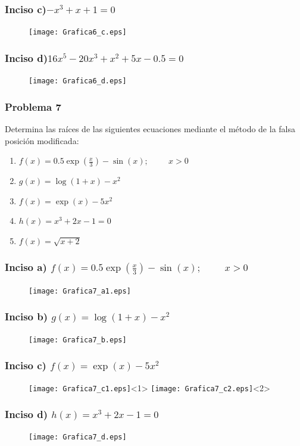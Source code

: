 \begin{frame}
\frametitle{Inciso c)$-x^{3} + x + 1 = 0$}
\begin{figure}
	\centering
	\texttt{[image: Grafica6\_c.eps]}
\end{figure}
\end{frame}
\begin{frame}
\frametitle{Inciso d)$16x^{5} - 20x^{3} + x^{2} + 5x - 0.5 = 0$}
\begin{figure}
	\centering
	\texttt{[image: Grafica6\_d.eps]}
\end{figure}
\end{frame}
\begin{frame}
\frametitle{Problema 7}
Determina las raíces de las siguientes ecuaciones mediante el método de la falsa posición modificada:
	\begin{enumerate}
		\renewcommand{\arraystretch}{1.5}
		\item $f(x) = 0.5\exp(\frac{x}{3})- \sin(x); \hspace{1cm} x > 0$
		\item $g(x) = \log(1 + x) - x^{2}$
		\item $f(x) = \exp(x) - 5x^{2}$
		\item $h(x) = x^{3} + 2x - 1 = 0$
		\item $f(x) = \sqrt{x+2}$
	\end{enumerate}
\end{frame}
\begin{frame}
\frametitle{Inciso a) $f(x) = 0.5\exp(\frac{x}{3})- \sin(x); \hspace{1cm} x > 0$}
\begin{figure}
	\centering
	\texttt{[image: Grafica7\_a1.eps]}
\end{figure}
\end{frame}
\begin{frame}
\frametitle{Inciso b) $g(x) = \log(1 + x) - x^{2}$}
\begin{figure}
	\centering
	\texttt{[image: Grafica7\_b.eps]}
\end{figure}
\end{frame}
\begin{frame}
\frametitle{Inciso c) $f(x) = \exp(x) - 5x^{2}$}
\begin{figure}
	\centering
	\texttt{[image: Grafica7\_c1.eps]}<1>
	\texttt{[image: Grafica7\_c2.eps]}<2>
\end{figure}
\end{frame}
\begin{frame}
\frametitle{Inciso d) $h(x) = x^{3} + 2x - 1 = 0$}
\begin{figure}
	\centering
	\texttt{[image: Grafica7\_d.eps]}
\end{figure}
\end{frame}
